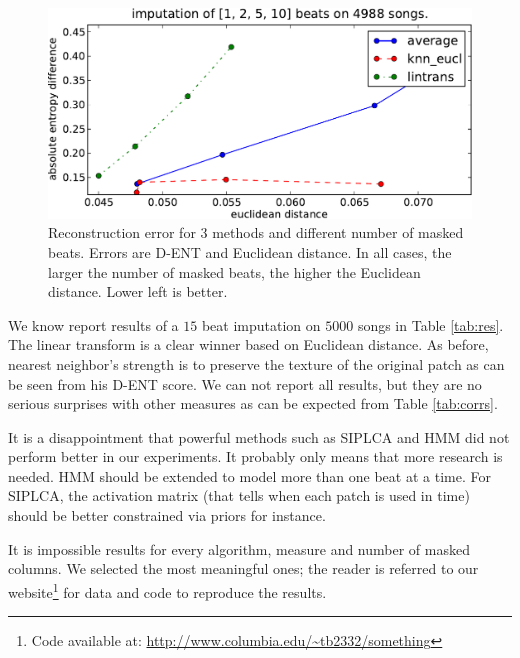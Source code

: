 \documentclass{article}
\begin{document}
\begin{figure}[t]
\begin{center}
\includegraphics[width=.9\columnwidth]{recon_score_in_2d_5k}
\end{center}
\caption{Reconstruction error for $3$ methods and different
number of masked beats. Errors are D-ENT and Euclidean
distance. In all cases, the larger the number of masked beats,
the higher the Euclidean distance. Lower left is better.
\label{fig:2dscore}}
\end{figure}

We know report results of a $15$ beat imputation on $5000$ songs in
Table \ref{tab:res}. The linear transform is a clear winner based
on Euclidean distance. As before, nearest neighbor's strength
is to preserve the texture of the original patch as can be seen
from his D-ENT score. We can not report all results, but they
are no serious surprises with other measures 
as can be expected from Table \ref{tab:corrs}.

It is a disappointment that powerful methods such as SIPLCA
and HMM did not perform better in our experiments. It
probably only means that more research is needed. HMM should
be extended to model more than one beat at a time. For SIPLCA,
the activation matrix (that tells when each patch is used in time)
should be better constrained via priors for instance.

It is impossible results for every algorithm, measure and number of masked columns.
We selected the most meaningful ones; the reader is referred to our 
website\footnote{Code available at: \url{http://www.columbia.edu/~tb2332/something}}
for data and code to reproduce the results.
\end{document}
